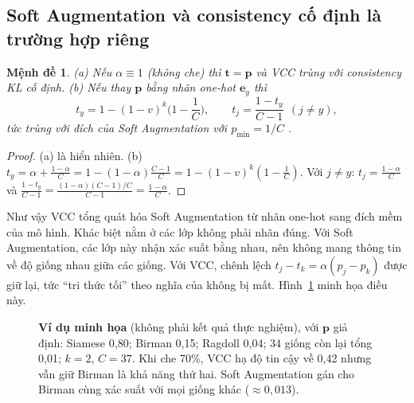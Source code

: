 \documentclass[11pt,a4paper]{article}
\theoremstyle{plain}
\newtheorem{proposition}{Mệnh đề}
\theoremstyle{definition}
\theoremstyle{remark}
\newcommand{\bp}{\bm{p}}
\newcommand{\bt}{\bm{t}}
\newcommand{\be}{\bm{e}}
\begin{document}
\subsection{Soft Augmentation và consistency cố định là trường hợp riêng}

\begin{proposition}
\label{prop:special}
(a) Nếu $\alpha\equiv1$ (không che) thì $\bt=\bp$ và VCC trùng với consistency KL cố định. (b) Nếu thay $\bp$ bằng nhãn one-hot $\be_y$ thì
\[
  t_y=1-(1-v)^k\Big(1-\frac1C\Big),\qquad t_j=\frac{1-t_y}{C-1}\ \ (j\neq y),
\]
tức trùng với đích của Soft Augmentation với $p_{\min}=1/C$ \cite{liu2023soft}.
\end{proposition}
\begin{proof}
(a) là hiển nhiên. (b) $t_y=\alpha+\frac{1-\alpha}{C}=1-(1-\alpha)\frac{C-1}{C}=1-(1-v)^k(1-\frac1C)$. Với $j\ne y$: $t_j=\frac{1-\alpha}{C}$ và $\frac{1-t_y}{C-1}=\frac{(1-\alpha)(C-1)/C}{C-1}=\frac{1-\alpha}{C}$.
\end{proof}

Như vậy VCC tổng quát hóa Soft Augmentation từ nhãn one-hot sang đích mềm của mô hình. Khác biệt nằm ở các lớp không phải nhãn đúng. Với Soft Augmentation, các lớp này nhận xác suất bằng nhau, nên không mang thông tin về độ giống nhau giữa các giống. Với VCC, chênh lệch $t_j-t_k=\alpha(p_j-p_k)$ được giữ lại, tức ``tri thức tối'' theo nghĩa của \cite{hinton2015distilling} không bị mất. Hình~\ref{fig:toy} minh họa điều này.

\begin{figure}[t]
\centering
{}
\caption{\textbf{Ví dụ minh họa} (không phải kết quả thực nghiệm), với $\bp$ giả định: Siamese 0,80; Birman 0,15; Ragdoll 0,04; 34 giống còn lại tổng 0,01; $k=2$, $C=37$. Khi che 70\%, VCC hạ độ tin cậy về 0,42 nhưng vẫn giữ Birman là khả năng thứ hai. Soft Augmentation gán cho Birman cùng xác suất với mọi giống khác ($\approx0{,}013$).}
\label{fig:toy}
\end{figure}
\end{document}
